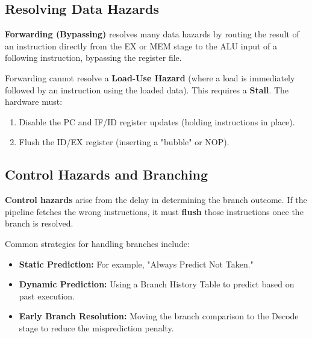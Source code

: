 \subsection{Resolving Data Hazards}

\begin{lemma}
\textbf{Forwarding (Bypassing)} resolves many data hazards by routing the result of an instruction directly from the EX or MEM stage to the ALU input of a following instruction, bypassing the register file.
\end{lemma}

\begin{important}
Forwarding cannot resolve a \textbf{Load-Use Hazard} (where a load is immediately followed by an instruction using the loaded data). This requires a \textbf{Stall}. The hardware must:
\begin{enumerate}
    \item Disable the PC and IF/ID register updates (holding instructions in place).
    \item Flush the ID/EX register (inserting a "bubble" or NOP).
\end{enumerate}
\end{important}

\subsection{Control Hazards and Branching}

\begin{definition}
\textbf{Control hazards} arise from the delay in determining the branch outcome. If the pipeline fetches the wrong instructions, it must \textbf{flush} those instructions once the branch is resolved.
\end{definition}

\begin{remark}
Common strategies for handling branches include:
\begin{itemize}
    \item \textbf{Static Prediction:} For example, "Always Predict Not Taken."
    \item \textbf{Dynamic Prediction:} Using a Branch History Table to predict based on past execution.
    \item \textbf{Early Branch Resolution:} Moving the branch comparison to the Decode stage to reduce the misprediction penalty.
\end{itemize}
\end{remark}

